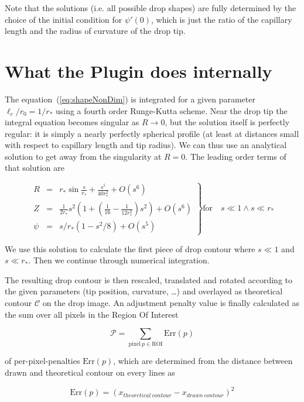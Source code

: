 \documentclass[fleqn]{scrartcl}
\begin{document}
Note that the solutions (i.e. all possible drop shapes) are fully
determined by the choice of the initial condition for $\psi'(0)$,
which is just the ratio of the capillary length and the radius of
curvature of the drop tip.

\section{What the Plugin does internally}
\label{sec:numerics}

The equation~(\ref{eq:shapeNonDim}) is integrated for a given parameter
$\ell_c/r_0 = 1/r_*$ using a fourth order Runge-Kutta scheme. Near the
drop tip the integral equation becomes singular as $R\to 0$, but the
solution itself is perfectly regular: it is simply a nearly perfectly
spherical profile (at least at distances small with respect to
capillary length and tip radius). We can thus use an analytical
solution to get away from the singularity at $R=0$. The leading order
terms of that solution are

\[
\left.%
\begin{array}{lll}
R & = & r_*\sin\frac{s}{r_*} + \frac{s^5}{40 r_*^2} + O(s^6) \\
Z & = & \frac{1}{2r_*} s^2 (1 + (\frac{1}{16} - \frac{1}{12r_*^2}) s^2) + O(s^6)\\
\psi & = & s/r_* (1-s^2/8) + O(s^5)
\end{array}\right\}
\mathrm{for}\quad s \ll 1 \wedge s \ll r_*
\]

We use this solution to calculate the first piece of drop contour
where $s \ll 1$ and $s \ll r_*$. Then we continue through numerical
integration.

The resulting drop contour is then rescaled, translated and rotated
according to the given parameters (tip position, curvature, \dots) and
overlayed as theoretical contour $\mathcal{C}$ on the drop image. An
adjustment penalty value is finally calculated as the sum over all
pixels in the Region Of Interest

\[
\mathcal{P} = \sum_{\mathrm{pixel}\ p \in \mathrm{ROI}} \mathrm{Err}(p)
\]

\noindent of per-pixel-penalties $\mathrm{Err}(p)$, which are
determined from the distance between drawn and theoretical contour on every lines as

\[
\mathrm{Err}(p) = (x_{theoretical\:contour} - x_{drawn\:contour})^2
\]
\end{document}
